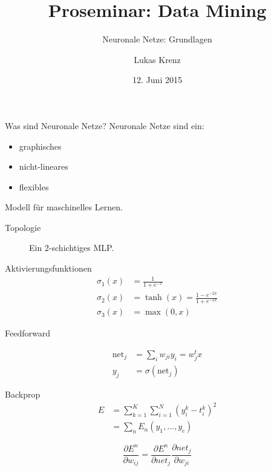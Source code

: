 \documentclass[10pt, compress, xetex]{beamer}
\title{Proseminar: Data Mining}
\subtitle{Neuronale Netze: Grundlagen}
\author{Lukas Krenz}
\date{12. Juni 2015}
\institute{Technische Universität München}
\begin{document}
\begin{frame}
\titlepage
\end{frame}


\begin{frame}{Was sind Neuronale Netze?}
Neuronale Netze sind ein:
\begin{itemize}
\item graphisches
\item nicht-lineares
\item flexibles
\end{itemize}
Modell für maschinelles Lernen.
\end{frame}

\begin{frame}{Topologie}
\begin{figure}[ht!]
\label{fig:MLP}
  \centering
    
  \caption{Ein 2-schichtiges MLP.}
\end{figure}

\end{frame}

\begin{frame}{Aktivierungsfunktionen}
\begin{align}
	\sigma_1(x) & =  \frac{1}{1+e^{-x}} \\
	\sigma_2(x) & =  \tanh(x) = \frac{1-e^{-2x}}{1+e^{-2x}} \\
	\sigma_3(x) & =  \max(0,x)
\end{align}
\end{frame}

\begin{frame}{Feedforward}
\begin{figure}[ht!]
  \centering
\end{figure}

\begin{align}
	\text{net}_j & = \sum_{i} w_{ji} y_i = w_j^t x \\
	y_j & = \sigma (\text{net}_j)
\end{align} 
\end{frame}

\begin{frame}{Backprop}
\begin{align}
	E &= \sum_{k=1}^K \sum_{i=1}^N \left( y_i^k - t_i^k \right)^2 \\
	  &=  \sum_n E_n(y_1, \ldots, y_c)
\end{align}

\begin{equation}
\frac{\partial E^n}{\partial w_{ij}} = \frac{\partial E^n}{\partial net_j}  \frac{\partial net_j }{\partial w_{ji}}
\end{equation}

\end{frame}
\end{document}
